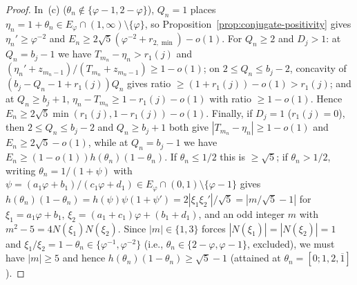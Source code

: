 \documentclass[11pt]{amsart}
\theoremstyle{definition}
\theoremstyle{remark}
\numberwithin{equation}{section}
\begin{document}
\begin{proof}
In~(c) ($\theta_n\notin\{\varphi-1,2-\varphi\}$), $Q_n=1$ places
$\eta_n=1+\theta_n\in E_\varphi\cap(1,\infty)\setminus\{\varphi\}$, so
Proposition~\ref{prop:conjugate-positivity} gives $\eta_n'\ge\varphi^{-2}$ and
$E_n\ge2\sqrt5(\varphi^{-2}+r_{2,\min})-o(1)$. For $Q_n\ge2$ and $D_j>1$:
at $Q_n=b_j-1$ we have $T_{m_n}-\eta_n>r_1(j)$ and
$(\eta_n'+z_{m_n-1})/(T_{m_n}+z_{m_n-1})\ge1-o(1)$; on $2\le Q_n\le b_j-2$,
concavity of $(b_j-Q_n-1+r_1(j))Q_n$ gives ratio $\ge(1+r_1(j))-o(1)>r_1(j)$;
and at $Q_n\ge b_j+1$, $\eta_n-T_{m_n}\ge1-r_1(j)-o(1)$ with ratio $\ge1-o(1)$.
Hence $E_n\ge2\sqrt5\min(r_1(j),1-r_1(j))-o(1)$. Finally, if $D_j=1$ ($r_1(j)=0$),
then $2\le Q_n\le b_j-2$ and $Q_n\ge b_j+1$ both give $|T_{m_n}-\eta_n|\ge1-o(1)$
and $E_n\ge2\sqrt5-o(1)$, while at $Q_n=b_j-1$ we have
$E_n\ge(1-o(1))h(\theta_n)(1-\theta_n)$. If $\theta_n\le1/2$ this is $\ge\sqrt5$;
if $\theta_n>1/2$, writing $\theta_n=1/(1+\psi)$ with
$\psi=(a_1\varphi+b_1)/(c_1\varphi+d_1)\in E_\varphi\cap(0,1)\setminus\{\varphi-1\}$
gives $h(\theta_n)(1-\theta_n)=h(\psi)\psi(1+\psi')=2|\xi_1\xi_2'|/\sqrt5=|m/\sqrt5-1|$
for $\xi_1=a_1\varphi+b_1$, $\xi_2=(a_1+c_1)\varphi+(b_1+d_1)$, and an odd
integer $m$ with $m^2-5=4N(\xi_1)N(\xi_2)$. Since $|m|\in\{1,3\}$ forces
$|N(\xi_1)|=|N(\xi_2)|=1$ and $\xi_1/\xi_2=1-\theta_n\in\{\varphi^{-1},\varphi^{-2}\}$
(i.e., $\theta_n\in\{2-\varphi,\varphi-1\}$, excluded), we must have $|m|\ge5$
and hence $h(\theta_n)(1-\theta_n)\ge\sqrt5-1$ (attained at $\theta_n=[0;1,2,\overline1]$).
\end{proof}
\end{document}
